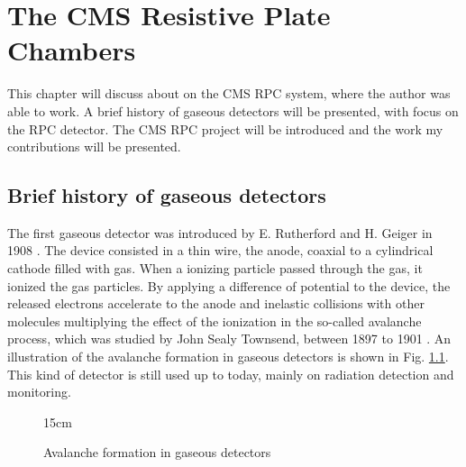 \chapter{The CMS Resistive Plate Chambers}\label{chap:rpc}

This chapter will discuss about on the CMS RPC system, where the author was able to work. A brief history of gaseous detectors will be presented, with focus on the RPC detector. The CMS RPC project will be introduced and the work my contributions will be presented.

\section{Brief history of gaseous detectors}

The first gaseous detector was introduced by E. Rutherford and H. Geiger in 1908 \cite{rutherford1908electrical}. The device consisted in a thin wire, the anode, coaxial to a cylindrical cathode filled with gas. When a ionizing particle passed through the gas, it ionized the gas particles. By applying a difference of potential to the device, the released electrons accelerate to the anode and inelastic collisions with other molecules multiplying the effect of the ionization in the so-called avalanche process, which was studied by John Sealy Townsend, between 1897 to 1901 \cite{peskov2018resistive}. An illustration of the avalanche formation in gaseous detectors is shown in Fig. \ref{fig:avalanche}. This kind of detector is still used up to today, mainly on radiation detection and monitoring.

\begin{figure}[!htm]{15cm}
\caption{Avalanche formation in gaseous detectors}%
\label{fig:avalanche}
\end{figure}

